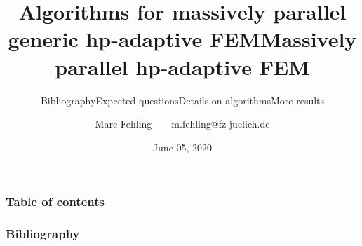 \documentclass[11pt]{beamer}
\author{Marc Fehling~~\vrule width0.3pt~~m.fehling@fz-juelich.de}
\title{Algorithms for massively parallel generic hp-adaptive FEM}
\subtitle{\vspace{-1em}}
\date{June 05, 2020}
\begin{document}
\maketitle

\begin{frame}
\frametitle{Table of contents}
\tableofcontents
\end{frame}






\appendix
\title{Massively parallel hp-adaptive FEM}
\subtitle{Bibliography}
\maketitle
\begin{frame}[allowframebreaks]
\frametitle{Bibliography}
\nocite{ainsworth1998,arndt2019,burstedde2018,eibner2007,houston2005,mitchell2014}
\setlength{\labelwidth}{\labelnumberwidth}
\printbibliography[title=Bibliography]
\end{frame}

\subtitle{Expected questions}
\maketitle






\subtitle{Details on algorithms}
\maketitle






\subtitle{More results}
\maketitle



\end{document}
